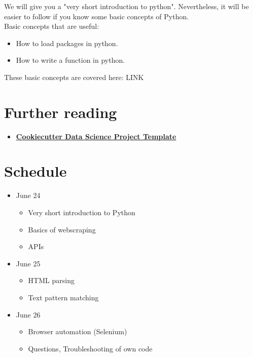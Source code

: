 \documentclass[a4paper]{article}
\begin{document}
We will give you a "very short introduction to python". Nevertheless,
it will be easier to follow if you know some basic concepts of Python.\\

Basic concepts that are useful:
\begin{itemize}
    \item How to load packages in python.
    \item How to write a function in python.
\end{itemize}

These basic concepts are covered here:
LINK

\section{Further reading}

\begin{itemize}
    \item{
      \href{
        http://drivendata.github.io/cookiecutter-data-science/}{
        \textbf{Cookiecutter Data Science Project Template}}}
\end{itemize}

\section{Schedule}

\begin{itemize}
	\item June 24
		\begin{itemize}
			\item Very short introduction to Python
			\item Basics of webscraping
			\item APIs
		\end{itemize}
	\item June 25
		\begin{itemize}
			\item HTML parsing
			\item Text pattern matching
		\end{itemize}
	\item June 26
		\begin{itemize}
			\item Browser automation (Selenium)
			\item Questions, Troubleshooting of own code
		\end{itemize}
\end{itemize}
\end{document}
